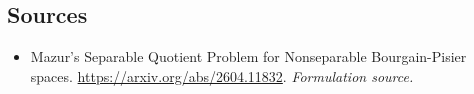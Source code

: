 \documentclass[11pt]{article}
\begin{document}
\subsection{Sources}
\begin{itemize}
\item[S1]Mazur's Separable Quotient Problem for Nonseparable Bourgain-Pisier spaces.
\url{https://arxiv.org/abs/2604.11832}.
\textit{Formulation source.}
\end{itemize}
\end{document}
